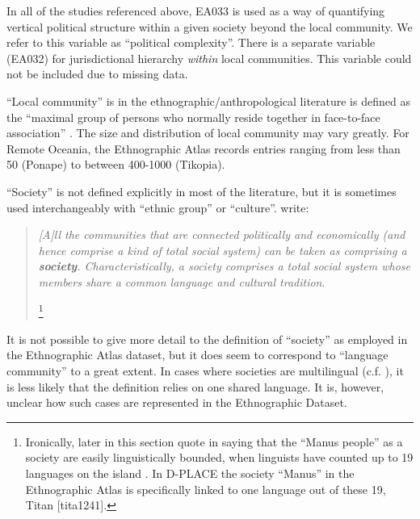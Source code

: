\documentclass[unnumsec,webpdf,modern,medium]{oup-authoring-template}
\begin{document}
\begin{appendices}
In all of the studies referenced above, EA033 is used as a way of quantifying vertical political structure within a given society beyond the local community. We refer to this variable as ``political complexity''. There is a separate variable (EA032) for jurisdictional hierarchy \emph{within} local communities. This variable could not be included due to missing data. 

``Local community'' is in the ethnographic/anthropological literature is defined as the ``maximal group of persons who normally reside together in face-to-face association'' \citep{yale1945outline}. The size and distribution of local community may vary greatly. For Remote Oceania, the Ethnographic Atlas records entries ranging from less than 50 (Ponape) to between 400-1000 (Tikopia).

``Society'' is not defined explicitly in most of the literature, but it is sometimes used interchangeably with ``ethnic group'' or ``culture''. \citet{roger1981cultural} write:

\begin{quotation}
\noindent\emph{[A]ll the communities that are connected politically and economically (and hence comprise a kind of total social system) can be taken as comprising a \textbf{society}. Characteristically, a society comprises a total social system whose members share a common language and cultural tradition}. 
\begin{flushright}
\citep[22]{roger1981cultural} \footnote{Ironically, later in this section \citet[23]{roger1981cultural} quote \citet[422]{schwartz1978culture} in saying that the ``Manus people'' as a society are easily linguistically bounded, when linguists have counted up to 19 languages on the island \citep{glottolog40}. In D-PLACE \citep{d_place_all} the society ``Manus'' in the Ethnographic Atlas is specifically linked to one language out of these 19, Titan [tita1241].} 

\end{flushright}
 \end{quotation}

It is not possible to give more detail to the definition of ``society'' as employed in the Ethnographic Atlas dataset, but it does seem to correspond to ``language community'' to a great extent. In cases where societies are multilingual (c.f. \citet{evans2017did}), it is less likely that the definition relies on one shared language. It is, however, unclear how such cases are represented in the Ethnographic Dataset.


\end{appendices}
\end{document}
